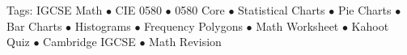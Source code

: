 \documentclass[11pt,a4paper]{article}
\begin{document}
\vspace{14pt}
\begin{center}
  \sffamily\scriptsize\textcolor{textmuted}{
    Tags: IGCSE Math $\bullet$ CIE 0580 $\bullet$ 0580 Core $\bullet$ Statistical Charts $\bullet$ Pie Charts $\bullet$ Bar Charts $\bullet$ Histograms $\bullet$ Frequency Polygons $\bullet$ Math Worksheet $\bullet$ Kahoot Quiz $\bullet$ Cambridge IGCSE $\bullet$ Math Revision
  }
\end{center}
\end{document}
